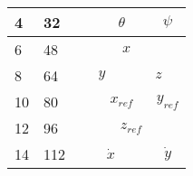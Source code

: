 \begin{table}[H]
\begin{tabular}{llclllllllllllllll}
\multicolumn{1}{|l|}{4}    & \multicolumn{1}{l|}{32}  & \multicolumn{1}{c|}{}  & \multicolumn{9}{c|}{$\theta$}                                                                                                                                                                                                  & \multicolumn{6}{c|}{$\psi$}                                                                                                                               \\ \hline
\multicolumn{1}{|l|}{6}    & \multicolumn{1}{l|}{48}  & \multicolumn{3}{c|}{}                                                    & \multicolumn{10}{c|}{$x$}                                                                                                                                                                                                                                  & \multicolumn{3}{l|}{}                                                       \\ \hline
\multicolumn{1}{|l|}{8}    & \multicolumn{1}{l|}{64}  & \multicolumn{7}{c|}{$y$}                                                                                                                                                     & \multicolumn{9}{c|}{$z$}                                                                                                                                                                                                             \\ \hline
\multicolumn{1}{|l|}{10}   & \multicolumn{1}{l|}{80}  & \multicolumn{1}{c|}{}  & \multicolumn{10}{c|}{$x_{ref}$}                                                                                                                                                                                                                          & \multicolumn{5}{c|}{$y_{ref}$}                                                                                                  \\ \hline
\multicolumn{1}{|l|}{12}   & \multicolumn{1}{l|}{96}  & \multicolumn{5}{c|}{}                                                                                                      & \multicolumn{10}{c|}{$z_{ref}$}                                                                                                                                                                                                                              & \multicolumn{1}{l|}{}   \\ \hline
\multicolumn{1}{|l|}{14}   & \multicolumn{1}{l|}{112} & \multicolumn{10}{c|}{$\dot{x}$}                                                                                                                                                                                                                         & \multicolumn{6}{c|}{$\dot{y}$}                                                                                                                            \\ \hline

\end{tabular}
\end{table}
